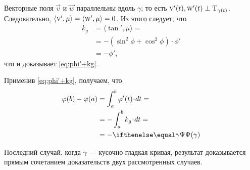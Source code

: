 Векторные поля $\vec v$ и $\vec w$ параллельны вдоль $\gamma$; то есть $\vec v'(t),\vec w'(t)\z\perp\T_{\gamma(t)}$.
Следовательно, $\langle\vec v',\mu\rangle\z=\langle\vec w',\mu\rangle\z=0$.
Из этого следует, что
\begin{align*}
k_g&=\langle\tan',\mu\rangle=
\\
&=-(\sin^2\phi+\cos^2\phi)\cdot \phi'
\\
&=-\phi',
\end{align*}
что и доказывает \ref{eq:phi'+kg}.

Применив \ref{eq:phi'+kg}, получаем, что 
\begin{align*}
\phi(b)-\phi(a)&=\int_a^b \phi'(t)\cdot dt=
\\
&=-\int_a^b k_g\cdot dt=
\\
&=-\tgc\gamma
\end{align*}

Последний случай, когда $\gamma$ --- кусочно-гладкая кривая, результат доказывается прямым сочетанием доказательств двух рассмотренных случаев. 
\qeds
